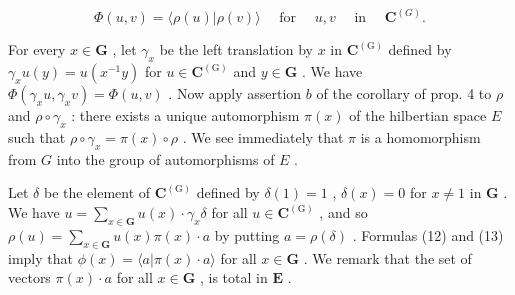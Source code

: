 \[
\Phi (u, v) = \langle \rho (u) | \rho (v) \rangle \quad \text { for } \quad u, v \quad \text { in } \quad \mathbf {C} ^ {(G)}.\tag{13}
\]

For every \(x \in \mathbf{G}\) , let \(\gamma_x\) be the left translation by \(x\) in \(\mathbf{C}^{(\mathrm{G})}\) defined by \(\gamma_x u(y) = u(x^{-1}y)\) for \(u \in \mathbf{C}^{(\mathrm{G})}\) and \(y \in \mathbf{G}\) . We have \(\Phi(\gamma_x u, \gamma_x v) = \Phi(u, v)\) . Now apply assertion \(b\) of the corollary of prop. 4 to \(\rho\) and \(\rho \circ \gamma_x\) : there exists a unique automorphism \(\pi(x)\) of the hilbertian space \(E\) such that \(\rho \circ \gamma_x = \pi(x) \circ \rho\) . We see immediately that \(\pi\) is a homomorphism from \(G\) into the group of automorphisms of \(E\) .

Let \(\delta\) be the element of \(\mathbf{C}^{(\mathrm{G})}\) defined by \(\delta(1) = 1\) , \(\delta(x) = 0\) for \(x \neq 1\) in \(\mathbf{G}\) . We have \(u = \sum_{x \in \mathbf{G}} u(x) \cdot \gamma_x \delta\) for all \(u \in \mathbf{C}^{(\mathrm{G})}\) , and so \(\rho(u) = \sum_{x \in \mathbf{G}} u(x) \pi(x) \cdot a\) by putting \(a = \rho(\delta)\) . Formulas (12) and (13) imply that \(\phi(x) = \langle a | \pi(x) \cdot a \rangle\) for all \(x \in \mathbf{G}\) . We remark that the set of vectors \(\pi(x) \cdot a\) for all \(x \in \mathbf{G}\) , is total in \(\mathbf{E}\) .

